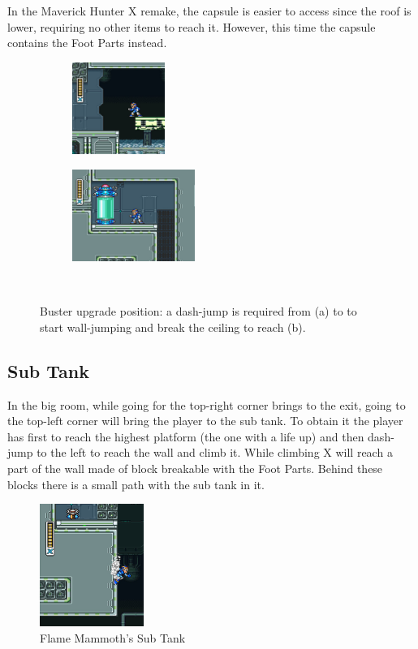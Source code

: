 In the Maverick Hunter X remake, the capsule is easier to access since the roof is lower, requiring no other items to reach it. However, this time the capsule contains the Foot Parts instead.
\begin{figure}[htp]
	\centering
	\begin{subfigure}{0.4\textwidth}
		\centering
		\includegraphics[height=3cm]{figures/X1/Flame_mammoth/Flame_armor_1.jpg}
		\caption{}
	\end{subfigure}
	\begin{subfigure}{0.4\textwidth}
		\centering
		\includegraphics[height=3cm]{figures/X1/Flame_mammoth/Flame_armor_2.jpg}
		\caption{}
	\end{subfigure}\\
	\caption{Buster upgrade position: a dash-jump is required from (a) to to start wall-jumping and break the ceiling to reach (b).}
\end{figure}

\subsection{Sub Tank}
In the big room, while going for the top-right corner brings to the exit, going to the top-left corner will bring the player to the sub tank. To obtain it the player has first to reach the highest platform (the one with a life up) and then dash-jump to the left to reach the wall and climb it. While climbing X will reach a part of the wall made of block breakable with the Foot Parts. Behind these blocks there is a small path with the sub tank in it.
\begin{figure}[htp]
	\centering
	\includegraphics[height=4cm]{figures/X1/Flame_mammoth/Flame_tank.jpg}
	\caption{Flame Mammoth's Sub Tank}
\end{figure}

